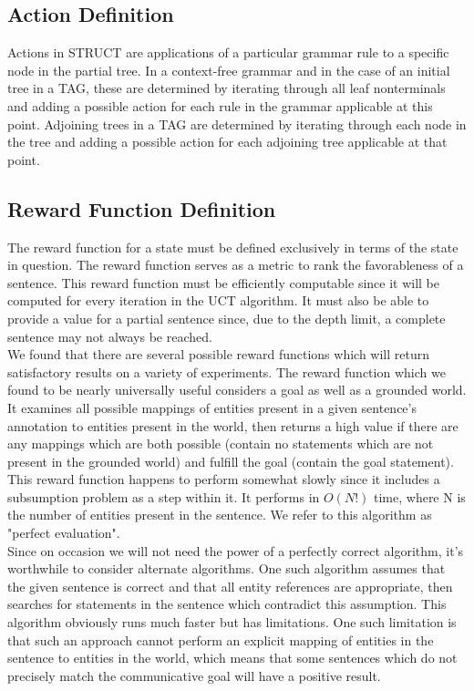 \subsection{Action Definition}

Actions in STRUCT are applications of a particular grammar rule to a specific node in the partial tree. In a
context-free grammar and in the case of an initial tree in a TAG, these are determined by iterating through all leaf
nonterminals and adding a possible action for each rule in the grammar applicable at this point. Adjoining trees in a
TAG are determined by iterating through each node in the tree and adding a possible action for each adjoining tree
applicable at that point.\\

 \subsection{Reward Function Definition}

 The reward function for a state must be defined exclusively in terms
 of the state in question.  The reward function serves as a metric to
 rank the favorableness of a sentence.  This reward function must be
 efficiently computable since it will be computed for every iteration
 in the UCT algorithm.  It must also be able to provide a value for a
 partial sentence since, due to the depth limit, a complete sentence
 may not always be reached.\\
 
 We found that there are several possible reward functions which will
 return satisfactory results on a variety of experiments.  The reward function
 which we found to be nearly universally useful considers a goal as well as a 
 grounded world.  It examines all possible mappings of entities present in
 a given sentence's annotation to entities present in the world, then returns
 a high value if there are any mappings which are both possible (contain no statements
 which are not present in the grounded world) and fulfill the goal (contain the
 goal statement).\\

This reward function happens to perform somewhat slowly since it includes
a subsumption problem as a step within it.  It performs in $O(N!)$ time, where
N is the number of entities present in the sentence.  We refer to this algorithm as
"perfect evaluation".\\

Since on occasion we will not need the power of a perfectly correct algorithm,
it's worthwhile to consider alternate algorithms.  One such algorithm assumes that
the given sentence is correct and that all entity references are appropriate, then
searches for statements in the sentence which contradict this assumption.  This
algorithm obviously runs much faster but has limitations.  One such limitation is
that such an approach cannot perform an explicit mapping of entities in the sentence
to entities in the world, which means that some sentences which do not precisely
match the communicative goal will have a positive result.\\

